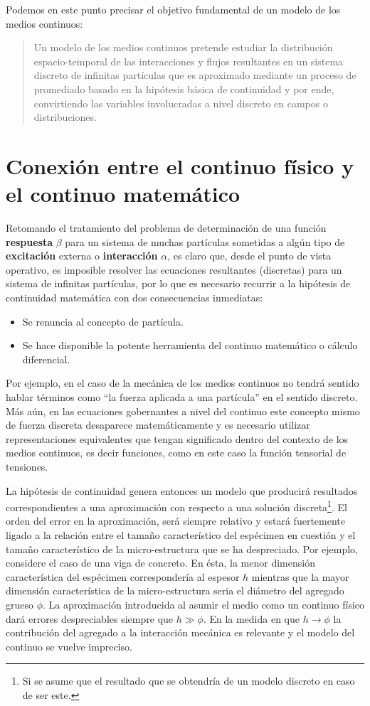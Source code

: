 \documentclass[../notas medios.tex]{subfiles}
\begin{document}
Podemos en este punto precisar el objetivo fundamental de un modelo de los medios continuos:
\begin{quote}
Un modelo de los medios continuos pretende estudiar la distribución espacio-temporal de las interacciones  y flujos   resultantes en un sistema discreto de infinitas partículas que es aproximado mediante un proceso de promediado basado en la hipótesis básica de continuidad y por ende, convirtiendo las variables involucradas a nivel discreto en campos o distribuciones.
\end{quote}

\section{Conexión entre el continuo físico y el continuo matemático}
Retomando el tratamiento del problema de determinación de una función {\bf
respuesta} $\beta$ para un sistema de muchas partículas sometidas a algún tipo de {\bf excitación} externa o {\bf interacción} $\alpha$, es
claro que, desde el punto de vista operativo, es imposible resolver las ecuaciones
resultantes (discretas) para un sistema de infinitas partículas, por lo que es necesario recurrir a la hipótesis de continuidad matemática con dos consecuencias inmediatas:
\begin{itemize}
\item Se renuncia al concepto de partícula.
\item Se hace disponible la potente herramienta del continuo matemático o
cálculo diferencial.
\end{itemize}

Por ejemplo, en el caso de la mecánica de los medios continuos no tendrá sentido
hablar términos como ``la fuerza aplicada a una partícula” en el sentido 
discreto. Más aún, en las ecuaciones gobernantes a nivel del continuo este 
concepto mismo de fuerza discreta desaparece matemáticamente y es necesario 
utilizar representaciones equivalentes que tengan significado dentro del 
contexto de los medios continuos, es decir funciones, como en este caso la 
función tensorial de tensiones.

La hipótesis de continuidad genera entonces un modelo que producirá resultados 
correspondientes a una aproximación con respecto a una solución 
discreta\footnote{Si se asume que el resultado que se obtendría de un modelo 
discreto  en caso de ser este.}. El orden del error en la aproximación, será 
siempre relativo y estará fuertemente ligado a la relación entre el tamaño 
característico del espécimen en cuestión y el tamaño característico de la 
micro-estructura que se ha despreciado.  Por ejemplo, considere el caso de una 
viga de concreto.  En ésta, la menor dimensión característica del espécimen 
correspondería al espesor $h$ mientras que la mayor dimensión característica de 
la micro-estructura seria el diámetro del agregado grueso $\phi$.  La 
aproximación introducida al asumir el medio como un continuo físico dará 
errores despreciables siempre que $h \gg \phi$.  En la medida en que $h \to 
\phi$   la contribución del agregado a la interacción mecánica es relevante y 
el modelo del continuo se vuelve impreciso.
\end{document}
